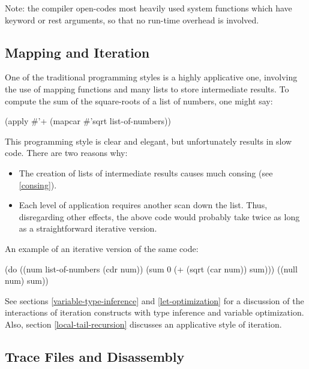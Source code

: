Note: the compiler open-codes most heavily used system functions which have
keyword or rest arguments, so that no run-time overhead is involved.


\subsection{Mapping and Iteration}

One of the traditional \llisp{} programming styles is a highly applicative one,
involving the use of mapping functions and many lists to store intermediate
results.  To compute the sum of the square-roots of a list of numbers, one
might say:

\begin{lisp}
(apply #'+ (mapcar #'sqrt list-of-numbers))
\end{lisp}

This programming style is clear and elegant, but unfortunately results
in slow code.  There are two reasons why:

\begin{itemize} 
\item The creation of lists of intermediate results causes much
  consing (see \ref{consing}).
  
\item Each level of application requires another scan down the list.
  Thus, disregarding other effects, the above code would probably take
  twice as long as a straightforward iterative version.
\end{itemize}


An example of an iterative version of the same code:
\begin{lisp}
(do ((num list-of-numbers (cdr num))
     (sum 0 (+ (sqrt (car num)) sum)))
    ((null num) sum))
\end{lisp}

See sections \ref{variable-type-inference} and \ref{let-optimization}
for a discussion of the interactions of iteration constructs with type
inference and variable optimization.  Also, section
\ref{local-tail-recursion} discusses an applicative style of
iteration.


\subsection{Trace Files and Disassembly}
\label{trace-files}

